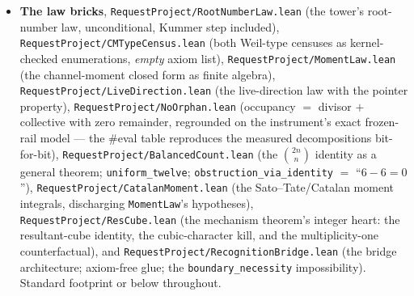 \documentclass[11pt]{article}
\theoremstyle{definition}
\theoremstyle{remark}
\begin{document}
\begin{itemize}
\texttt{tmp/construction\_arm.py} + \texttt{\_notes.md} (the cycle pinned,
eight landings, the generalization memo),
\texttt{tmp/carrier\_inversion.py} + \texttt{\_notes.md} (blind inversion
4/4, the three-tier Faltings boundary),
\texttt{tmp/k3\_isogeny.py} (the per-channel retention result),
\texttt{tmp/g9\_verification.py} and \texttt{tmp/g9\_rail\_pairing.py}
(the $\mathrm{Sym}^9$ forced zero and derivative; the certificate-collapse
curve; the general $m$-identity), \texttt{tmp/transient\_form.py},
\texttt{tmp/transient\_pairing.py}, and
\texttt{tmp/registration\_theorem.py} + \texttt{\_notes.md} (the derived
mirror, the product anomaly, the dichotomy theorem).
\item \textbf{The law bricks},
\texttt{RequestProject/RootNumberLaw.lean} (the tower's root-number law,
unconditional, Kummer step included),
\texttt{RequestProject/CMTypeCensus.lean} (both Weil-type censuses as
kernel-checked enumerations, \emph{empty} axiom list),
\texttt{RequestProject/MomentLaw.lean} (the channel-moment closed form as
finite algebra), \texttt{RequestProject/LiveDirection.lean} (the
live-direction law with the pointer property),
\texttt{RequestProject/NoOrphan.lean} (occupancy $=$ divisor $+$
collective with zero remainder, regrounded on the instrument's exact
frozen-rail model --- the \#eval table reproduces the measured
decompositions bit-for-bit),
\texttt{RequestProject/BalancedCount.lean} (the $\binom{2n}{n}$ identity
as a general theorem; \texttt{uniform\_twelve};
\texttt{obstruction\_via\_identity} $=$ ``$6-6=0$''),
\texttt{RequestProject/CatalanMoment.lean} (the Sato--Tate/Catalan moment
integrals, discharging \texttt{MomentLaw}'s hypotheses),
\texttt{RequestProject/ResCube.lean} (the mechanism theorem's integer
heart: the resultant-cube identity, the cubic-character kill, and the
multiplicity-one counterfactual), and
\texttt{RequestProject/RecognitionBridge.lean} (the bridge architecture;
axiom-free glue; the \texttt{boundary\_necessity} impossibility).
Standard footprint or below throughout.
\end{itemize}
\end{document}
